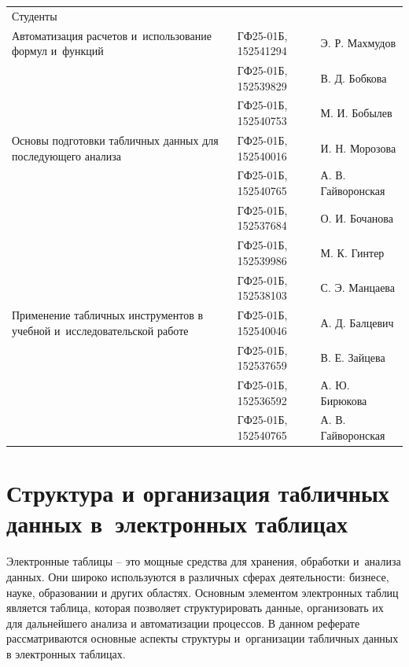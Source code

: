 \documentclass{ou}
\begin{document}
\begin{flushleft}
\doublespacing
\begin{tabularx}{\textwidth}{@{} p{} l l @{}}
Студенты     &                     &         \\
\multirow{-2.27}{\hsize}{\singlespacing Автоматизация расчетов и~использование формул и~функций}
             & ГФ25-01Б, 152541294 & Э. Р. Махмудов\\
             & ГФ25-01Б, 152539829 & В. Д. Бобкова\\
             & ГФ25-01Б, 152540753 & М. И. Бобылев\\
\multirow{-2.27}{\hsize}{\singlespacing Основы подготовки табличных данных для последующего анализа}
             & ГФ25-01Б, 152540016 & И. Н. Морозова\\
             & ГФ25-01Б, 152540765 & А. В. Гайворонская\\
             & ГФ25-01Б, 152537684 & О. И. Бочанова\\
             & ГФ25-01Б, 152539986 & М. К. Гинтер\\
             & ГФ25-01Б, 152538103 & С. Э. Манцаева\\
\multirow{-2.27}{\hsize}{\singlespacing Применение табличных инструментов в учебной и~исследовательской
работе}
             & ГФ25-01Б, 152540046 & А. Д. Балцевич\\
             & ГФ25-01Б, 152537659 & В. Е. Зайцева\\
             & ГФ25-01Б, 152536592 & А. Ю. Бирюкова\\
             & ГФ25-01Б, 152540765 & А. В. Гайворонская\\
            
\end{tabularx}
\end{flushleft}
\newpage
{
\sloppy
\tableofcontents
}
\newpage
\onehalfspacing
\section{Структура и организация табличных данных в~электронных таблицах}
Электронные таблицы -- это мощные средства для хранения, обработки и~анализа данных. Они широко используются в различных сферах деятельности: бизнесе, науке, образовании и других областях. Основным элементом электронных таблиц является таблица, которая позволяет структурировать данные, организовать их для дальнейшего анализа и автоматизации процессов. В данном реферате рассматриваются основные аспекты структуры и~организации табличных данных в электронных таблицах.
\end{document}
